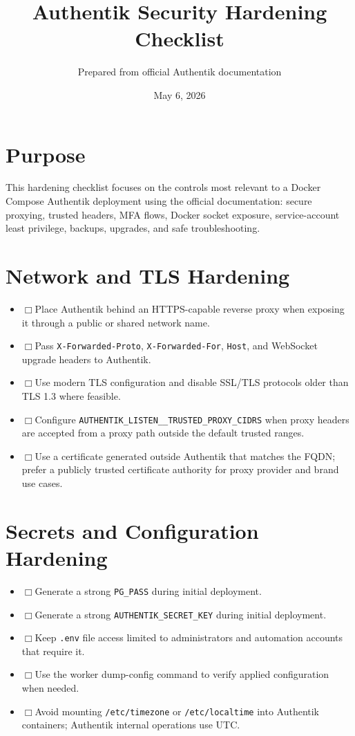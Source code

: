 \documentclass[11pt]{article}
\title{Authentik Security Hardening Checklist}\author{Prepared from official Authentik documentation}\date{May 6, 2026}
\newcommand{\checkbox}{$\Box$\hspace{0.4em}}
\begin{document}
\maketitle

\section*{Purpose}
This hardening checklist focuses on the controls most relevant to a Docker Compose Authentik deployment using the official documentation: secure proxying, trusted headers, MFA flows, Docker socket exposure, service-account least privilege, backups, upgrades, and safe troubleshooting.

\section*{Network and TLS Hardening}
\begin{itemize}
\item \checkbox Place Authentik behind an HTTPS-capable reverse proxy when exposing it through a public or shared network name.
\item \checkbox Pass \texttt{X-Forwarded-Proto}, \texttt{X-Forwarded-For}, \texttt{Host}, and WebSocket upgrade headers to Authentik.
\item \checkbox Use modern TLS configuration and disable SSL/TLS protocols older than TLS 1.3 where feasible.
\item \checkbox Configure \texttt{AUTHENTIK\_LISTEN\_\_TRUSTED\_PROXY\_CIDRS} when proxy headers are accepted from a proxy path outside the default trusted ranges.
\item \checkbox Use a certificate generated outside Authentik that matches the FQDN; prefer a publicly trusted certificate authority for proxy provider and brand use cases.
\end{itemize}

\section*{Secrets and Configuration Hardening}
\begin{itemize}
\item \checkbox Generate a strong \texttt{PG\_PASS} during initial deployment.
\item \checkbox Generate a strong \texttt{AUTHENTIK\_SECRET\_KEY} during initial deployment.
\item \checkbox Keep \texttt{.env} file access limited to administrators and automation accounts that require it.
\item \checkbox Use the worker dump-config command to verify applied configuration when needed.
\item \checkbox Avoid mounting \texttt{/etc/timezone} or \texttt{/etc/localtime} into Authentik containers; Authentik internal operations use UTC.
\end{itemize}
\end{document}
